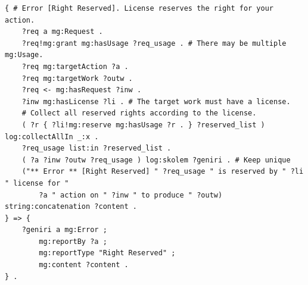 \begin{tcolorbox}[title=rules\_analysis\_granting.n3 > Right Reserved Error, colback=white, colframe=gray, boxrule=0.2mm, boxsep=1mm, left=0mm, right=0mm, top=0.1mm, bottom=0.1mm] %
  \begin{lstlisting}[language=Turtle, breaklines=false, columns=fullflexible, basicstyle=\footnotesize]
{ # Error [Right Reserved]. License reserves the right for your action.
    ?req a mg:Request .
    ?req!mg:grant mg:hasUsage ?req_usage . # There may be multiple mg:Usage.
    ?req mg:targetAction ?a .
    ?req mg:targetWork ?outw .
    ?req <- mg:hasRequest ?inw .
    ?inw mg:hasLicense ?li . # The target work must have a license.
    # Collect all reserved rights according to the license.
    ( ?r { ?li!mg:reserve mg:hasUsage ?r . } ?reserved_list ) log:collectAllIn _:x .
    ?req_usage list:in ?reserved_list .
    ( ?a ?inw ?outw ?req_usage ) log:skolem ?geniri . # Keep unique
    ("** Error ** [Right Reserved] " ?req_usage " is reserved by " ?li " license for " 
        ?a " action on " ?inw " to produce " ?outw) string:concatenation ?content .
} => {
    ?geniri a mg:Error ;
        mg:reportBy ?a ;
        mg:reportType "Right Reserved" ;
        mg:content ?content .
} .
  \end{lstlisting}
\end{tcolorbox}

